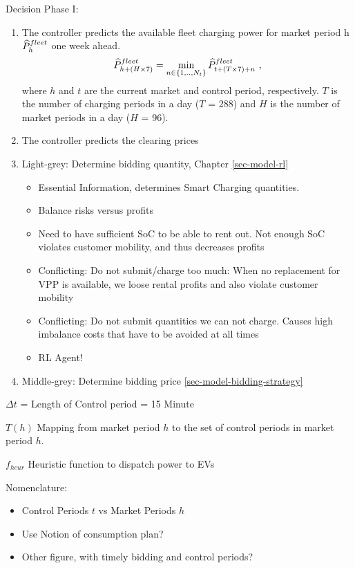 \documentclass[a4paper, 12pt]{article}
\begin{document}
Decision Phase I:
\begin{enumerate}
\item The controller predicts the available fleet charging power for market period
h \(\widehat{P}^{fleet}_{h}\) one week ahead.
\begin{equation}
    \widehat{P}^{fleet}_{h + (H \times 7)} = \min_{n \in \{1, .., N_t\}} \widehat{P}^{fleet}_{t + (T \times 7) + n} \text{ ,}
\end{equation}
where \(h\) and \(t\) are the current market and control period, respectively. \(T\) is the number of charging
periods in a day (\(T\) =  288) and \(H\) is the number of market periods in a day
(\(H\) = 96).

\item The controller predicts the clearing prices

\item Light-grey: Determine bidding quantity, Chapter \ref{sec-model-rl}
\begin{itemize}
\item Essential Information, determines Smart Charging quantities.
\item Balance risks versus profits
\item Need to have sufficient SoC to be able to rent out. Not enough SoC violates
customer mobility, and thus decreases profits
\item Conflicting: Do not submit/charge too much: When no replacement for VPP is
available, we loose rental profits and also violate customer mobility
\item Conflicting: Do not submit quantities we can not charge. Causes high
imbalance costs that have to be avoided at all times
\item RL Agent!
\end{itemize}
\item Middle-grey: Determine bidding price \ref{sec-model-bidding-strategy}
\end{enumerate}

\(\Delta t\) = Length of Control period = 15 Minute

\(T(h)\) Mapping from market period \(h\) to the set of control periods in market
period \(h\).

\(f_{heur}\) Heuristic function to dispatch power to EVs

Nomenclature:
\begin{itemize}
\item Control Periods \(t\) vs Market Periods \(h\)
\item Use Notion of consumption plan?
\item Other figure, with timely bidding and control periods?
\end{itemize}
\end{document}
